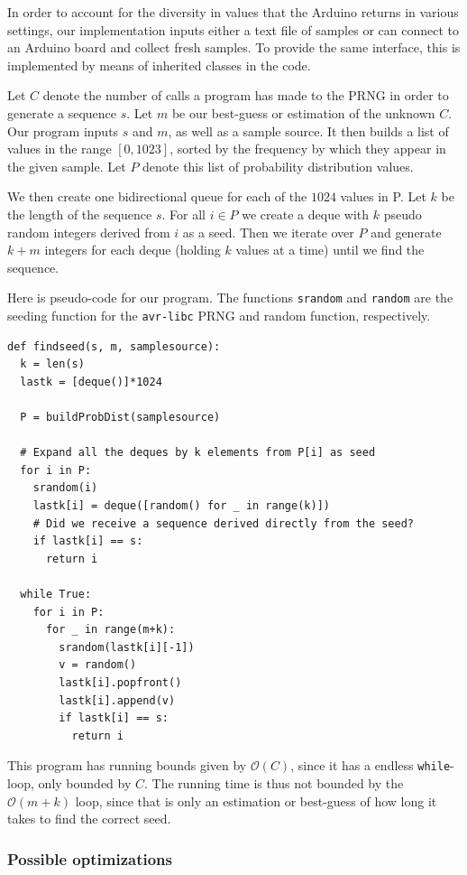 \documentclass[a4paper]{article}           %
\begin{document}
In order to account for the diversity in values that the Arduino returns in various settings, our implementation inputs either a text file of samples or can connect to an Arduino board and collect fresh samples. To provide the same interface, this is implemented by means of inherited classes in the code. 

Let $C$ denote the number of calls a program has made to the PRNG in order to generate a sequence $s$. Let $m$ be our best-guess or estimation of the unknown $C$. Our program inputs $s$ and $m$, as well as a sample source. It then builds a list of values in the range $[0, 1023]$, sorted by the frequency by which they appear in the given sample. Let $P$ denote this list of probability distribution values.

We then create one bidirectional queue for each of the $1024$ values in P. Let $k$ be the length of the sequence $s$. For all $i \in P$ we create a deque with $k$ pseudo random integers derived from $i$ as a seed. Then we iterate over $P$ and generate $k+m$ integers for each deque (holding $k$ values at a time) until we find the sequence. 

Here is pseudo-code for our program. The functions \texttt{srandom} and \texttt{random} are the seeding function for the \texttt{avr-libc} PRNG and random function, respectively. 

\begin{lstlisting}[caption=Finding the seed]
def findseed(s, m, samplesource):
  k = len(s)
  lastk = [deque()]*1024

  P = buildProbDist(samplesource)

  # Expand all the deques by k elements from P[i] as seed
  for i in P:
    srandom(i)
    lastk[i] = deque([random() for _ in range(k)])
    # Did we receive a sequence derived directly from the seed?
    if lastk[i] == s:
      return i

  while True:
    for i in P:
      for _ in range(m+k):
        srandom(lastk[i][-1])
        v = random()
        lastk[i].popfront()
        lastk[i].append(v)
        if lastk[i] == s:
          return i
\end{lstlisting}

This program has running bounds given by $\mathcal{O}(C)$, since it has a endless \texttt{while}-loop, only bounded by $C$. The running time is thus not bounded by the $\mathcal{O}(m+k)$ loop, since that is only an estimation or best-guess of how long it takes to find the correct seed. 

\subsubsection{Possible optimizations}
\end{document}
